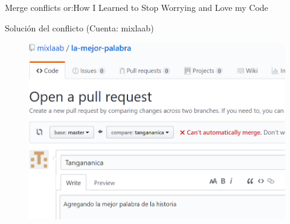\documentclass[10pt]{beamer}
\begin{document}

    


\begin{frame}{Merge conflicts or:}{How I Learned to Stop Worrying and Love my Code \heartsuit}

\begin{block}{Solución del conflicto (Cuenta: mixlaab)}

\begin{figure}[h!]
\centering
\includegraphics [scale=0.25]{conflict}
\label{fig:issues}
\end{figure}
    
\end{block}

\end{frame}
\end{document}
